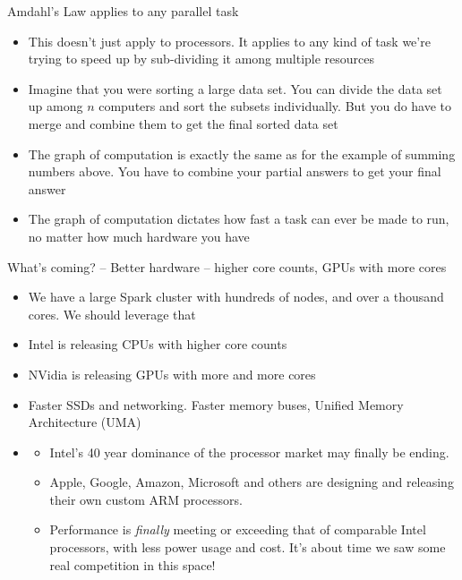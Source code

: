 \documentclass{beamer}
\begin{document}
\begin{frame}{Amdahl's Law applies to any parallel task}
	\begin{itemize}
	\item This doesn't just apply to processors. It applies to any kind of task we're
	trying to speed up by sub-dividing it among multiple resources	

	\item Imagine that you were sorting a large data set. You can divide the data set
	up among $n$ computers and sort the subsets individually. But you do have to
	merge and combine them to get the final sorted data set

	\item The graph of computation is exactly the same as for the example of summing
	numbers above. You have to combine your partial answers to get your final answer

	\item The graph of computation dictates how fast a task can ever be made to
	run, no matter how much hardware you have

	\end{itemize}
\end{frame}

\begin{frame}{What's coming? -- Better hardware -- higher core counts, GPUs with more cores}
	\begin{itemize}
		\item We have a large Spark cluster with hundreds of nodes, and over a thousand cores. We should leverage that
		\item Intel is releasing CPUs with higher core counts
		\item NVidia is releasing GPUs with more and more cores
		\item Faster SSDs and networking. Faster memory buses, Unified Memory Architecture (UMA)
		\item 
		\begin{itemize}
			\item Intel's 40 year dominance of the processor market may finally
				be ending.
			\item Apple, Google, Amazon, Microsoft and others are
					designing and releasing their own custom ARM processors.
			\item Performance is \emph{finally} meeting or exceeding that of
					comparable Intel processors, with less power usage and cost.
					It's about time we saw some real competition in this space!

		\end{itemize}
	\end{itemize}
\end{frame}
\end{document}
